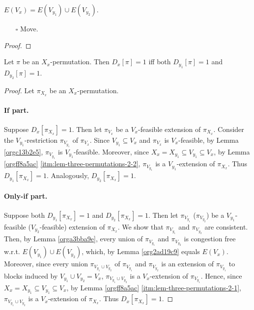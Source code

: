 \documentclass[fontsize=11pt,paper=a4]{book}
\begin{document}
\begin{lem}
\(E(V_x)=E(V_{y_1})\cup E(V_{y_2})\).
\label{org2ad19c9}
\end{lem}

\begin{itemize}
\item[{$\square$}] Move.
\end{itemize}

\begin{proof}
\end{proof}

\begin{lem}
Let \(\pi\) be an \(X_x\)-permutation.
Then \(D_x[\pi]=1\) iff both \(D_{y_1}[\pi]=1\) and \(D_{y_2}[\pi]=1\).
\label{orgc1a8591}
\end{lem}

\begin{proof}
Let \(\pi_{X_x}\) be an \(X_x\)-permutation.

\paragraph{If part.}
Suppose \(D_x[\pi_{X_x}]=1\).
Then let \(\pi_{V_x}\) be a \(V_x\)-feasible extension of \(\pi_{X_x}\).
Consider the \(V_{y_1}\)-restriction \(\pi_{V_{y_1}}\) of \(\pi_{V_x}\).
Since \(V_{y_1}\subseteq V_x\) and \(\pi_{V_x}\) is \(V_x\)-feasible, by Lemma \ref{orgc13b2e5}, \(\pi_{V_{y_1}}\) is \(V_{y_1}\)-feasible.
Moreover, since \(X_x=X_{y_1}\subseteq V_{y_1}\subseteq V_x\), by Lemma \ref{orgff8a5ac} \ref{itm:lem-three-permutations-2-2}, \(\pi_{V_{y_1}}\) is a \(V_{y_1}\)-extension of \(\pi_{X_x}\).
Thus \(D_{y_1}[\pi_{X_x}]=1\).
Analogously, \(D_{y_2}[\pi_{X_x}]=1\).

\paragraph{Only-if part.}
Suppose both \(D_{y_1}[\pi_{X_x}]=1\) and \(D_{y_2}[\pi_{X_x}]=1\).
Then let \(\pi_{V_{y_1}}\) (\(\pi_{V_{y_2}}\)) be a \(V_{y_1}\)-feasible (\(V_{y_2}\)-feasible) extension of \(\pi_{X_x}\).
We show that \(\pi_{V_{y_1}}\) and \(\pi_{V_{y_2}}\) are consistent.
Then, by Lemma \ref{orga3bba9e}, every union of \(\pi_{V_{y_1}}\) and \(\pi_{V_{y_2}}\) is congestion free w.r.t. \(E(V_{y_1})\cup E(V_{y_2})\), which, by Lemma \ref{org2ad19c9} equals \(E(V_x)\).
Moreover, since every union \(\pi_{V_{y_1}\cup V_{y_2}}\) of \(\pi_{V_{y_1}}\) and \(\pi_{V_{y_2}}\) is an extension of \(\pi_{V_{y_1}}\) to blocks induced by \(V_{y_1}\cup V_{y_2}=V_x\), \(\pi_{V_{y_1}\cup V_{y_2}}\) is a \(V_x\)-extension of \(\pi_{V_{y_1}}\).
Hence, since \(X_x=X_{y_1}\subseteq V_{y_1}\subseteq V_x\), by Lemma \ref{orgff8a5ac} \ref{itm:lem-three-permutations-2-1}, \(\pi_{V_{y_1}\cup V_{y_2}}\) is a \(V_x\)-extension of \(\pi_{X_x}\).
Thus \(D_x[\pi_{X_x}]=1\).


\end{proof}
\end{document}
